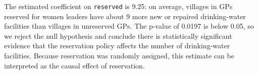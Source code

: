 \documentclass[11pt]{article}
\begin{document}
The estimated coefficient on \texttt{reserved} is 9.25: on average, villages in GPs reserved for women leaders have about 9 more new or repaired drinking-water facilities than villages in unreserved GPs. The p-value of 0.0197 is below 0.05, so we reject the null hypothesis and conclude there is statistically significant evidence that the reservation policy affects the number of drinking-water facilities. Because reservation was randomly assigned, this estimate can be interpreted as the causal effect of reservation.
\end{document}
